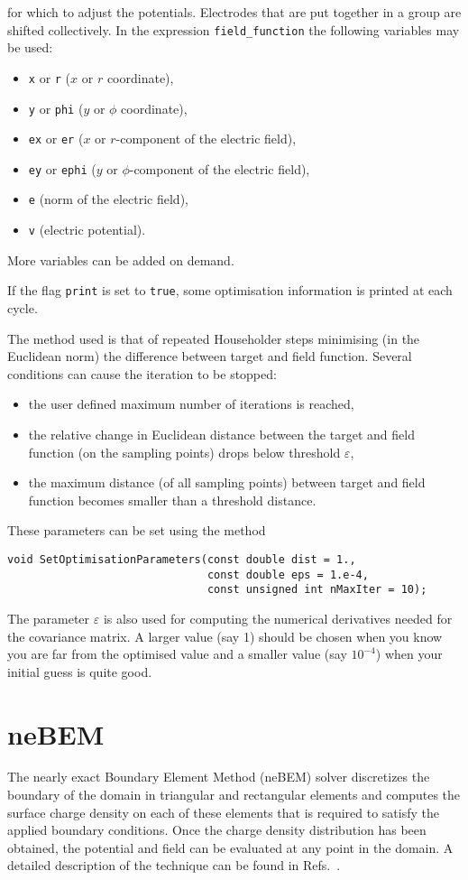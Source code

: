 for which to adjust the potentials.
Electrodes that are put together in a group are shifted collectively.
In the expression \texttt{field\_function} the following variables may be 
used:
\begin{itemize}
  \item
  \texttt{x} or \texttt{r} ($x$ or $r$ coordinate),
  \item
  \texttt{y} or \texttt{phi} ($y$ or $\phi$ coordinate),
  \item
  \texttt{ex} or \texttt{er} ($x$ or $r$-component of the electric field),
  \item
  \texttt{ey} or \texttt{ephi} ($y$ or $\phi$-component of the electric field),
  \item
  \texttt{e} (norm of the electric field),
  \item
  \texttt{v} (electric potential). 
\end{itemize} 
More variables can be added on demand.

If the flag \texttt{print} is set to \texttt{true}, 
some optimisation information is printed at each cycle.

The method used is that of repeated Householder steps minimising 
(in the Euclidean norm) the difference between target and field 
function. Several conditions can cause the iteration to be stopped:
\begin{itemize}
\item
the user defined maximum number of iterations is reached,
\item
the relative change in Euclidean distance between the target and field 
function (on the sampling points) drops below threshold $\varepsilon$, 
\item
the maximum distance (of all sampling points) between target and field 
function becomes smaller than a threshold distance.
\end{itemize}
These parameters can be set using the method
\begin{lstlisting} 
void SetOptimisationParameters(const double dist = 1.,
                               const double eps = 1.e-4,
                               const unsigned int nMaxIter = 10);
\end{lstlisting}
The parameter $\varepsilon$ is also used for computing the numerical 
derivatives needed for the covariance matrix. A larger value (say 1) 
should be chosen when you know you are far from the optimised value 
and a smaller value (say $10^{-4}$) when your initial guess is quite good.

\section{neBEM}
The nearly exact Boundary Element Method (neBEM) solver discretizes
the boundary of the domain in triangular and rectangular elements 
and computes the surface charge density on each of these elements that is
required to satisfy the applied boundary conditions. 
Once the charge density distribution has been obtained, 
the potential and field can be evaluated at any point in the domain. 
A detailed description of the technique can be found in 
Refs.~\cite{Mukhopadhyay2006Eng,Mukhopadhyay2006,Mukhopadhyay2009}. 
 

